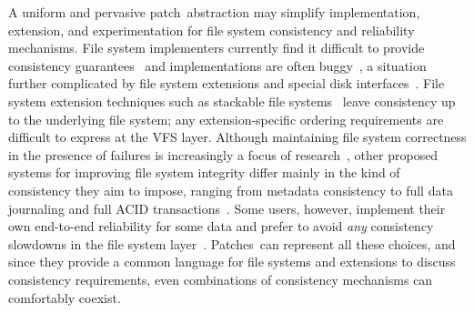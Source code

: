 \documentclass[9pt,twocolumn,letterpaper]{article}
\newcommand{\patch}{patch}
\newcommand{\Patches}{Patches}
\begin{document}
A uniform and pervasive \patch\ abstraction may simplify
 implementation, extension, and experimentation for
 file system consistency and reliability mechanisms.
%
File system implementers currently find it difficult to provide
 consistency guarantees~\cite{tweedie98journaling,mckusick99soft}
 and implementations are often buggy~\cite{yang04using,yang06explode},
 a situation further complicated by file system extensions and
 special disk interfaces~\cite{soules03metadata,fast04versionfs,quinlan02venti,cornell04wayback,wright03ncryptfs,sivathanu03semantically-smart,sivathanu05database-aware}.
%
File system extension techniques such as stackable file
 systems~\cite{zadok00fist,zadok99extending,heidemann94filesystem,rosenthal90evolving}
 leave consistency up to the underlying file system; any extension-specific
 ordering requirements are difficult to express at the VFS layer.
%
Although maintaining file system
 correctness in the presence of failures is increasingly a focus of
 research~\cite{sivathanuetal05-logic,denehyetal05-journal-guided},
%
other proposed systems for improving file system integrity
 differ mainly in the kind of consistency they aim to impose, ranging from
 metadata consistency to full data journaling and full ACID
 transactions~\cite{gal05transactional,liskov04transactional,wright06extending}.
%
Some users, however, implement their own end-to-end reliability for some data
 and prefer to avoid \emph{any} consistency
 slowdowns in the file system layer~\cite{googleext2}.
%
\Patches\ can represent all these choices, and since they provide a common
 language for file systems and extensions to discuss consistency
 requirements, even combinations of consistency mechanisms can
 comfortably coexist.


\begin{comment}
But different extensions within a file system, or different
 applications over the file system, may require different types of
 consistency semantics, and performance suffers when lower layers are
 unnecessarily denied the opportunity to reorder writes;
\Patches\ can implement many consistency mechanisms, including
 soft updates and journaling, and can allow combinations of different
 consistency protocols to exist at the same time.
\Patches\ provide a simple and effective way for such extensions to
 express their requirements of the storage system, adding to the
 requirements already expressed by the file system itself.
\end{comment}
\end{document}
